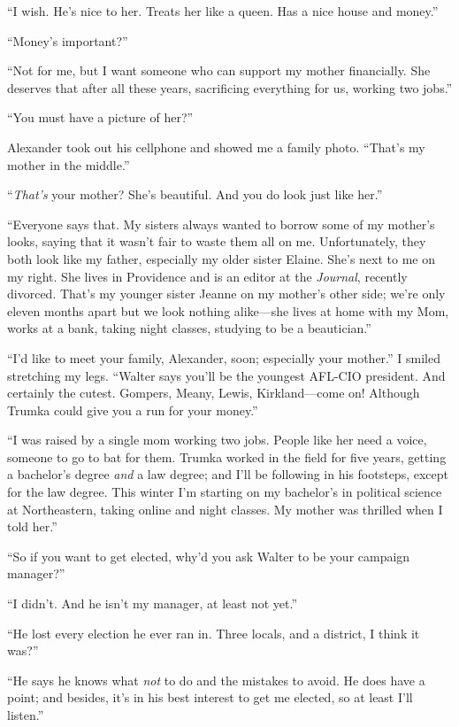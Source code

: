 ``I wish. He's nice to her. Treats her like a queen. Has a nice house
and money.''

``Money's important?''

``Not for me, but I want someone who can support my mother financially.
She deserves that after all these years, sacrificing everything for us,
working two jobs.''

``You must have a picture of her?''

Alexander took out his cellphone and showed me a family photo. ``That's
my mother in the middle.''

``\emph{That's} your mother? She's beautiful. And you do look just like
her.''

``Everyone says that. My sisters always wanted to borrow some of my
mother's looks, saying that it wasn't fair to waste them all on me.
Unfortunately, they both look like my father, especially my older sister
Elaine. She's next to me on my right. She lives in Providence and is an
editor at the \emph{Journal}, recently divorced. That's my younger
sister Jeanne on my mother's other side; we're only eleven months apart
but we look nothing alike---she lives at home with my Mom, works at a
bank, taking night classes, studying to be a beautician.''

``I'd like to meet your family, Alexander, soon; especially your
mother.'' I smiled stretching my legs. ``Walter says you'll be the
youngest AFL-CIO president. And certainly the cutest. Gompers, Meany,
Lewis, Kirkland---come on! Although Trumka could give you a run for your
money.''

``I was raised by a single mom working two jobs. People like her need a
voice, someone to go to bat for them. Trumka worked in the field for
five years, getting a bachelor's degree \emph{and} a law degree; and
I'll be following in his footsteps, except for the law degree. This
winter I'm starting on my bachelor's in political science at
Northeastern, taking online and night classes. My mother was thrilled
when I told her.''

``So if you want to get elected, why'd you ask Walter to be your
campaign manager?''

``I didn't. And he isn't my manager, at least not yet.''

``He lost every election he ever ran in. Three locals, and a district, I
think it was?''

``He says he knows what \emph{not} to do and the mistakes to avoid. He
does have a point; and besides, it's in his best interest to get me
elected, so at least I'll listen.''

